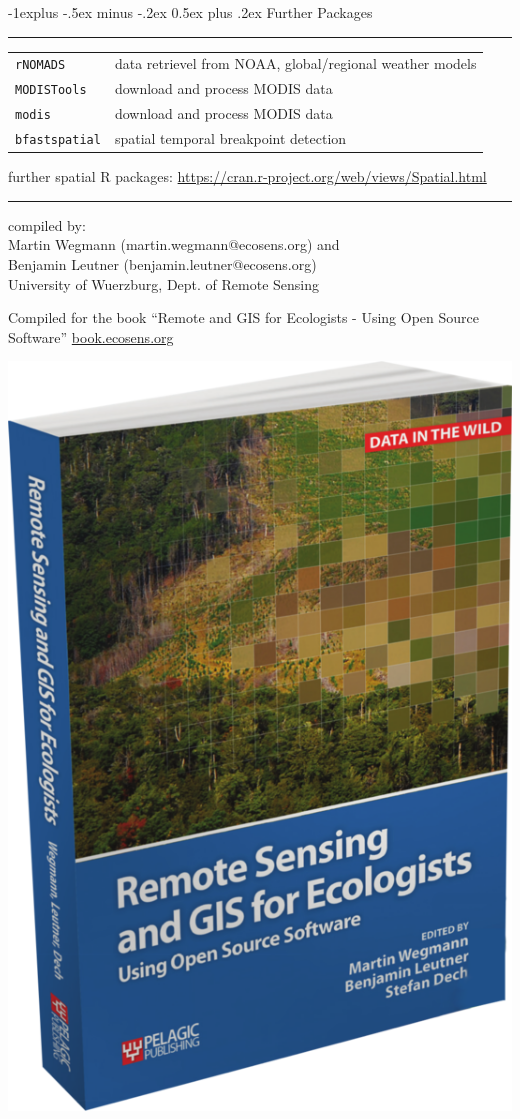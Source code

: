 \documentclass[10pt,landscape]{article}
\makeatletter
\renewcommand{\subsection}{\@startsection{subsection}{2}{0mm}%
                                {-1explus -.5ex minus -.2ex}%
                                {0.5ex plus .2ex}%
                                {\normalfont\normalsize\bfseries}}
\makeatother
\begin{document}
\begin{multicols}{3}
\begin{tabular}{@{}p{\the\MyLen}%
                @{}p{\linewidth-\the\MyLen}@{}}
\end{tabular}

\subsection{Further Packages}

\rule{0.32\textwidth}{0.4pt}

\begin{tabular}{@{}ll@{}}
\verb!rNOMADS!    & data retrievel from NOAA, global/regional weather models \\
\verb!MODISTools!  & download and process MODIS data\\
\verb!modis!  & download and process MODIS data\\
\verb!bfastspatial!  & spatial temporal breakpoint detection\\
\end{tabular}
further spatial R packages:
\url{https://cran.r-project.org/web/views/Spatial.html}



\scriptsize

\rule{0.32\textwidth}{0.4pt}

\vspace{.2cm}

compiled by: \vspace{.2cm}\\Martin Wegmann (martin.wegmann@ecosens.org) and \\Benjamin Leutner (benjamin.leutner@ecosens.org) \\ University of Wuerzburg, Dept. of Remote Sensing \\ \THEYEAR	

\vspace{.2cm}

Compiled for the book ``Remote and GIS for Ecologists - Using Open Source Software'' \url{book.ecosens.org}


\bigskip

\bigskip



\begin{center}
 \includegraphics[width=.2\textwidth]{pics/RS_GIS_Ecology_book_wegmann_leutner_dech_book_ecosens_org_BookCover.png}
\end{center}



\end{multicols}
\end{document}
